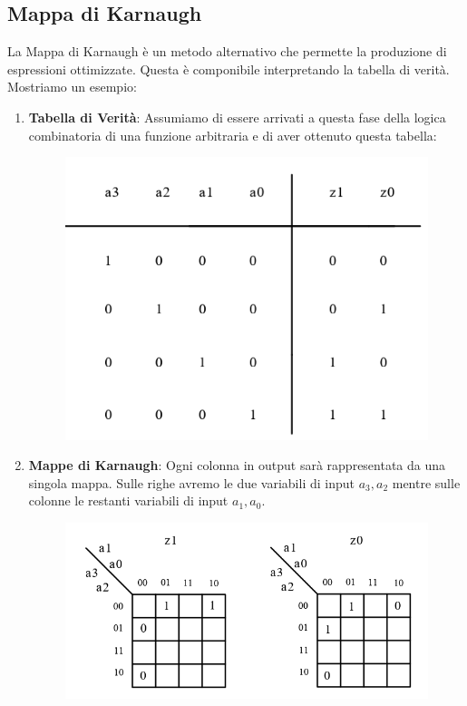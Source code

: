 \documentclass{article}
\begin{document}
\newpage

\subsection{Mappa di Karnaugh}

La Mappa di Karnaugh è un metodo alternativo che permette la produzione di espressioni ottimizzate. Questa è componibile interpretando la tabella di verità. Mostriamo un esempio:

\begin{enumerate}
    \item \textbf{Tabella di Verità}: Assumiamo di essere arrivati a questa fase della logica combinatoria di una funzione arbitraria e di aver ottenuto questa tabella:
    \begin{figure}[htbp]
        \center
        \includegraphics[scale=0.4]{img/tabellaEsempioKarnaugh.png}
    \end{figure}
    \item \textbf{Mappe di Karnaugh}: Ogni colonna in output sarà rappresentata da una singola mappa. Sulle righe avremo le due variabili di input $a_{3},a_{2}$ mentre sulle colonne le restanti variabili di input $a_{1},a_{0}$. 

    
    \begin{figure}[htbp]
        \center
        \includegraphics[scale=0.42]{img/tabellaEsempioKarnaugh1.png}
    \end{figure}
    

\end{enumerate}
\end{document}
